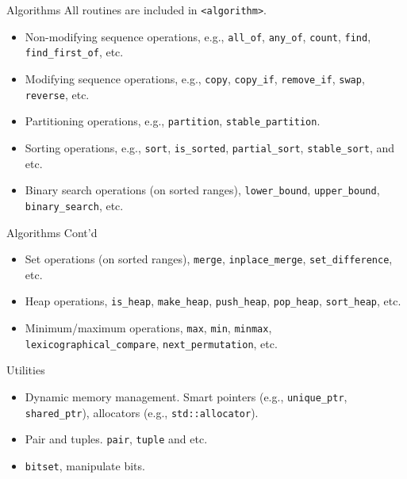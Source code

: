 \documentclass[presentation]{beamer}
\begin{document}
\begin{frame}[fragile,label={sec:orgheadline74}]{Algorithms}
 All routines are included in \texttt{<algorithm>}.

\begin{itemize}
\item Non-modifying sequence operations, e.g., \texttt{all\_of}, \texttt{any\_of},
\texttt{count}, \texttt{find}, \texttt{find\_first\_of}, etc.
\item Modifying sequence operations, e.g., \texttt{copy}, \texttt{copy\_if},
\texttt{remove\_if}, \texttt{swap}, \texttt{reverse}, etc.
\item Partitioning operations, e.g., \texttt{partition}, \texttt{stable\_partition}.
\item Sorting operations, e.g., \texttt{sort}, \texttt{is\_sorted}, \texttt{partial\_sort},
\texttt{stable\_sort}, and etc.
\item Binary search operations (on sorted ranges), \texttt{lower\_bound},
\texttt{upper\_bound}, \texttt{binary\_search}, etc.
\end{itemize}
\end{frame}

\begin{frame}[fragile,label={sec:orgheadline75}]{Algorithms Cont'd}
 \begin{itemize}
\item Set operations (on sorted ranges), \texttt{merge}, \texttt{inplace\_merge},
\texttt{set\_difference}, etc.
\item Heap operations, \texttt{is\_heap}, \texttt{make\_heap}, \texttt{push\_heap}, \texttt{pop\_heap},
\texttt{sort\_heap}, etc.
\item Minimum/maximum operations, \texttt{max}, \texttt{min}, \texttt{minmax},
\texttt{lexicographical\_compare}, \texttt{next\_permutation}, etc.
\end{itemize}
\end{frame}

\begin{frame}[fragile,label={sec:orgheadline76}]{Utilities}
 \begin{itemize}
\item Dynamic memory management.  Smart pointers (e.g., \texttt{unique\_ptr},
\texttt{shared\_ptr}), allocators (e.g., \texttt{std::allocator}).
\item Pair and tuples.  \texttt{pair}, \texttt{tuple} and etc.
\item \texttt{bitset}, manipulate bits.
\end{itemize}
\end{frame}
\end{document}
